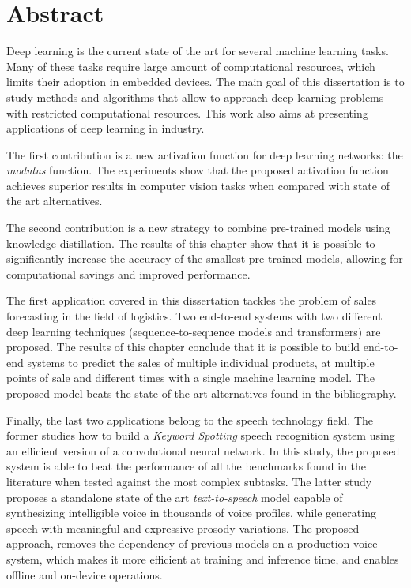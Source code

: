 
\chapter*{Abstract}


Deep learning is the current state of the art for several machine learning tasks. Many of these tasks require large amount of computational resources, which limits their adoption in embedded devices. The main goal of this dissertation is to study methods and algorithms that allow to approach deep learning problems with restricted computational resources. This work also aims at presenting applications of deep learning in industry.

The first contribution is a new activation function for deep learning networks: the \textit{modulus} function. The experiments show that the proposed activation function achieves superior results in computer vision tasks when compared with state of the art alternatives.

The second contribution is a new strategy to combine pre-trained models using knowledge distillation. The results of this chapter show that it is possible to significantly increase the accuracy of the smallest pre-trained models, allowing for computational savings and improved performance.

The first application covered in this dissertation tackles the problem of sales forecasting in the field of logistics. Two end-to-end systems with two different deep learning techniques (sequence-to-sequence models and transformers) are proposed. The results of this chapter conclude that it is possible to build end-to-end systems to predict the sales of multiple individual products, at multiple points of sale and different times with a single machine learning model. The proposed model beats the state of the art alternatives found in the bibliography.

Finally, the last two applications belong to the speech technology field. The former studies how to build a \textit{Keyword Spotting} speech recognition system using an efficient version of a convolutional neural network. In this study, the proposed system is able to beat the performance of all the benchmarks found in the literature when tested against the most complex subtasks. The latter study proposes a standalone state of the art \textit{text-to-speech} model capable of synthesizing intelligible voice in thousands of voice profiles, while generating speech with meaningful and expressive prosody variations. The proposed approach, removes the dependency of previous models on a production voice system, which makes it more efficient at training and inference time, and enables offline and on-device operations. 





\clearpage
